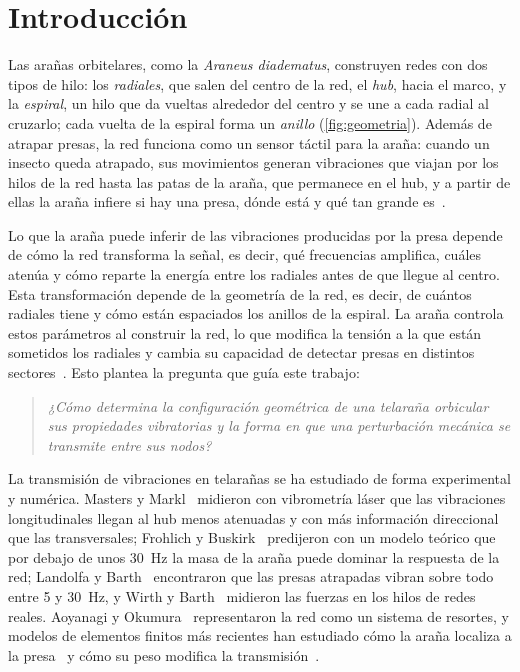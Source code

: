 \documentclass[fleqn,final]{jaes}
\begin{document}
\section{Introducción}\label{sec:intro}

Las arañas orbitelares, como la \textit{Araneus diadematus}, construyen redes
con dos tipos de hilo: los \emph{radiales}, que salen del centro de la red,
el \emph{hub}, hacia el marco, y la \emph{espiral}, un hilo que da
vueltas alrededor del centro y se une a cada radial al cruzarlo; cada
vuelta de la espiral forma un \emph{anillo}
(\cref{fig:geometria}). Además de atrapar presas, la red funciona como
un sensor táctil para la araña: cuando un insecto queda atrapado, sus movimientos generan
vibraciones que viajan por los hilos de la red hasta las patas de la araña, que permanece en el hub, y a partir de ellas la araña infiere si hay una presa, dónde está y qué tan grande
es~\cite{masters1981,mortimer2016,mortimer2019decoding}.

Lo que la araña puede inferir de las vibraciones producidas por la presa depende de cómo la red transforma la señal, es decir, qué frecuencias amplifica, cuáles atenúa y cómo reparte la energía entre
los radiales antes de que llegue al centro. Esta transformación depende de la geometría de la red, es decir, de cuántos radiales tiene y cómo están espaciados los anillos de la espiral.
La araña controla estos parámetros al construir la red, lo que modifica la tensión a la que están sometidos los radiales y cambia su capacidad de detectar presas en distintos sectores~\cite{nakata2010}. Esto plantea la pregunta que guía este trabajo:
\begin{quote}
\textit{¿Cómo determina la configuración geométrica de una telaraña
orbicular sus propiedades vibratorias y la forma en que una perturbación mecánica se transmite entre sus nodos?}
\end{quote}

La transmisión de vibraciones en telarañas se ha estudiado de forma
experimental y numérica. Masters y Markl~\cite{masters1981} midieron con
vibrometría láser que las vibraciones longitudinales llegan al hub menos
atenuadas y con más información direccional que las transversales;
Frohlich y Buskirk~\cite{frohlich1982} predijeron con un modelo teórico
que por debajo de unos 30~Hz la masa de la araña puede dominar la
respuesta de la red; Landolfa y
Barth~\cite{landolfa1996} encontraron que las presas atrapadas vibran
sobre todo entre 5 y 30~Hz, y Wirth y Barth~\cite{wirth1992} midieron las
fuerzas en los hilos de redes reales. Aoyanagi y
Okumura~\cite{aoyanagi2010} representaron la red como un sistema de
resortes, y modelos de elementos finitos más recientes han estudiado cómo
la araña localiza a la presa~\cite{mortimer2019decoding,lott2022} y cómo
su peso modifica la transmisión~\cite{yavuz2024}.
\end{document}
